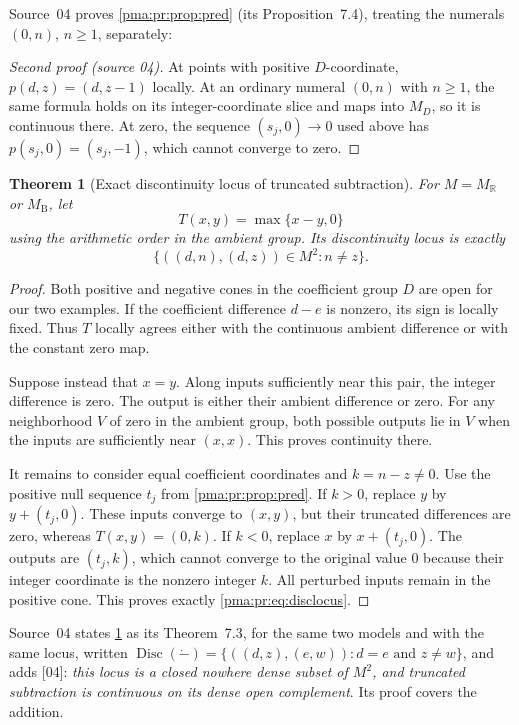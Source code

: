 \documentclass[11pt]{article}
\numberwithin{equation}{section}
\newtheorem{theorem}{Theorem}[section]
\theoremstyle{definition}
\theoremstyle{remark}
\newcommand{\R}{\mathbb R}
\newcommand{\MR}{M_{\R}}
\newcommand{\MB}{M_{\mathrm B}}
\newcommand{\Disc}{\operatorname{Disc}}
\newcommand{\monus}{\mathbin{\dot{-}}}
\newcommand{\src}[1]{\textup{\textsf{\small[#1]}}}
\begin{document}
Source~04 proves \cref{pma:pr:prop:pred} (its Proposition~7.4), treating the
numerals $(0,n)$, $n\ge1$, separately:

\begin{proof}[Second proof (source 04)]
At points with positive $D$-coordinate, $p(d,z)=(d,z-1)$ locally. At an
ordinary numeral $(0,n)$ with $n\geq1$, the same formula holds on its
integer-coordinate slice and maps into $M_D$, so it is continuous there.
At zero, the sequence $(s_j,0)\to0$ used above has
$p(s_j,0)=(s_j,-1)$, which cannot converge to zero.
\end{proof}

\begin{theorem}[Exact discontinuity locus of truncated subtraction]
\label{pma:pr:thm:truncated}\label{pma:pr:thm:monuslocus}
For $M=\MR$ or $\MB$, let
\[
 T(x,y)=\max\{x-y,0\}
\]
using the arithmetic order in the ambient group. Its discontinuity locus
is exactly
\begin{equation}
 \bigl\{((d,n),(d,z))\in M^2:n\neq z\bigr\}.
 \label{pma:pr:eq:disclocus}
\end{equation}
\end{theorem}
\begin{proof}
Both positive and negative cones in the coefficient group $D$ are open
for our two examples. If the coefficient difference $d-e$ is nonzero,
its sign is locally fixed. Thus $T$ locally agrees either with the
continuous ambient difference or with the constant zero map.

Suppose instead that $x=y$. Along inputs sufficiently near this pair,
the integer difference is zero. The output is either their ambient
difference or zero. For any neighborhood $V$ of zero in the ambient
group, both possible outputs lie in $V$ when the inputs are sufficiently
near $(x,x)$. This proves continuity there.

It remains to consider equal coefficient coordinates and $k=n-z\neq0$.
Use the positive null sequence $t_j$ from \cref{pma:pr:prop:pred}.
If $k>0$, replace $y$ by $y+(t_j,0)$. These inputs converge to $(x,y)$,
but their truncated differences are zero, whereas $T(x,y)=(0,k)$.
If $k<0$, replace $x$ by $x+(t_j,0)$. The outputs are $(t_j,k)$, which
cannot converge to the original value $0$ because their integer
coordinate is the nonzero integer $k$. All perturbed inputs remain in
the positive cone. This proves exactly \eqref{pma:pr:eq:disclocus}.
\end{proof}

Source~04 states \cref{pma:pr:thm:truncated} as its Theorem~7.3, for the
same two models and with the same locus, written
$\Disc(\monus)=\{((d,z),(e,w)):d=e\text{ and }z\ne w\}$, and adds \src{04}:
\emph{this locus is a closed nowhere dense subset of $M^2$, and truncated
subtraction is continuous on its dense open complement}. Its proof covers the
addition.
\end{document}
